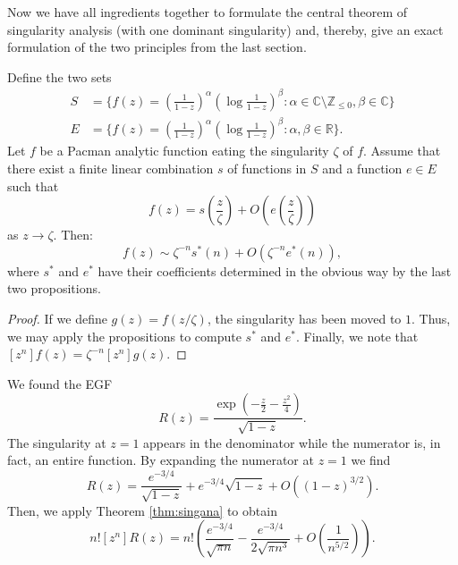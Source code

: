 Now we have all ingredients together to formulate the central theorem of singularity analysis (with one dominant singularity) and, thereby, give an exact formulation of the two principles from the last section.


\begin{thm}
\label{thm:singana}
Define the two sets
\begin{align*}
    S &= \{ f(z) = \left( \frac{1}{1-z} \right)^\alpha \left( \log \frac{1}{1-z} \right) ^{\beta} : \alpha \in \mathbb{C}\setminus\mathbb{Z}_{\leq 0}, \beta \in \mathbb{C} \} \\
    E &= \{ f(z) = \left( \frac{1}{1-z} \right)^\alpha \left( \log \frac{1}{1-z} \right)^\beta : \alpha, \beta \in \mathbb{R} \}.
\end{align*}
Let $f$ be a Pacman analytic function eating the singularity $\zeta$ of $f$.
Assume that there exist a finite linear combination $s$ of functions in $S$ and a function $e \in E$ such that 
\begin{equation*}
    f(z) = s \left( \frac{z}{\zeta} \right) + O \left( e \left( \frac{z}{\zeta} \right) \right)
\end{equation*}
as $z \to \zeta$. Then:
\begin{equation*}
    [z^n] f(z) \sim \zeta^{-n} s^*(n) + O(\zeta^{-n} e^*(n)), 
\end{equation*}
where $s^*$ and $e^*$ have their coefficients determined in the obvious way by the last two propositions.
\end{thm}

\begin{proof}
    If we define $g(z) = f(z/\zeta)$, the singularity has been moved to $1$.
    Thus, we may apply the propositions to compute $s^*$ and $e^*$.
    Finally, we note that $[z^n] f(z) = \zeta^{-n} [z^n] g(z)$.
\end{proof}





\begin{exm}
\label{exm:anareggraphs}

We found the EGF
\[
    R(z) = \frac{\exp\left(-\frac{z}{2}-\frac{z^2}{4}\right)}{\sqrt{1-z}}.
\]
The singularity at $z=1$ appears in the denominator while the numerator is, in fact, an entire function. 
By expanding the numerator at $z=1$ we find
\[
    R(z) = \frac{e^{-3/4}}{\sqrt{1-z}} + e^{-3/4}\sqrt{1-z} + O((1-z)^{3/2}).
\]
Then, we apply Theorem \ref{thm:singana} to obtain
\[
    n! [z^n] R(z) = n!\left(\frac{e^{-3/4}}{\sqrt{\pi n}} - \frac{e^{-3/4}}{2 \sqrt{\pi n^3}} + O\left( \frac{1}{n^{5/2}} \right) \right).
\]
\end{exm}



